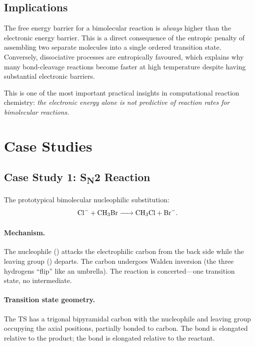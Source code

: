 \documentclass[11pt]{article}
\numberwithin{equation}{section}
\begin{document}
\subsection{Implications}

The free energy barrier for a bimolecular reaction is \emph{always} higher than the electronic energy barrier. This is a direct consequence of the entropic penalty of assembling two separate molecules into a single ordered transition state. Conversely, dissociative processes are entropically favoured, which explains why many bond-cleavage reactions become faster at high temperature despite having substantial electronic barriers.

This is one of the most important practical insights in computational reaction chemistry: \emph{the electronic energy alone is not predictive of reaction rates for bimolecular reactions.}


\section{Case Studies}
\label{sec:case_studies}

\subsection{Case Study 1: \texorpdfstring{S\textsubscript{N}2}{SN2} Reaction}

The prototypical bimolecular nucleophilic substitution:
\begin{equation}
\ce{Cl^- + CH3Br -> CH3Cl + Br^-}.
\end{equation}

\paragraph{Mechanism.} The nucleophile () attacks the electrophilic carbon from the back side while the leaving group () departs. The carbon undergoes Walden inversion (the three hydrogens ``flip'' like an umbrella). The reaction is concerted---one transition state, no intermediate.

\paragraph{Transition state geometry.} The TS has a trigonal bipyramidal carbon with the nucleophile and leaving group occupying the axial positions, partially bonded to carbon. The  bond is elongated relative to the product; the  bond is elongated relative to the reactant.
\end{document}
